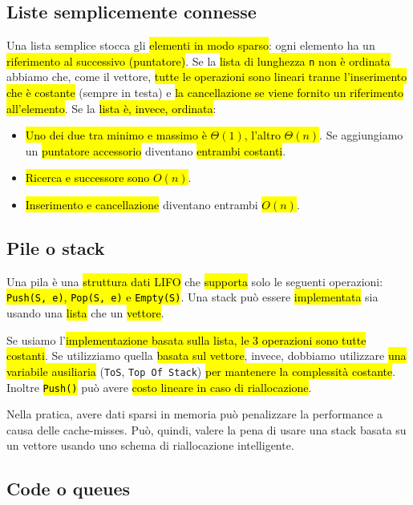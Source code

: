 \documentclass[a4paper,11pt,twoside]{article}
\theoremstyle{plain}
\theoremstyle{definition}
\theoremstyle{remark}
\begin{document}
\subsection{Liste semplicemente connesse}\label{sec:linked-list}

Una lista semplice stocca gli \hl{elementi in modo sparso}: ogni elemento ha un
\hl{riferimento al successivo (puntatore)}. Se la \hl{lista di lunghezza
\texttt{n} non è ordinata} abbiamo che, come il vettore, \hl{tutte le operazioni
sono lineari tranne l'inserimento che è costante} (sempre in testa) e \hl{la
cancellazione se viene fornito un riferimento all'elemento}. Se la \hl{lista è,
invece, ordinata}:

\begin{itemize}
  \item \hl{Uno dei due tra minimo e massimo è $\Theta(1)$, l'altro
    $\Theta(n)$}. Se aggiungiamo un \hl{puntatore accessorio} diventano
    \hl{entrambi costanti}.
  \item \hl{Ricerca e successore sono $O(n)$}.
  \item \hl{Inserimento e cancellazione} diventano entrambi \hl{$O(n)$}.
\end{itemize}

\subsection{Pile o stack}\label{sec:stack}

Una pila è una \hl{struttura dati LIFO} che \hl{supporta} solo le seguenti
operazioni: \hl{\texttt{Push(S, e)}, \texttt{Pop(S, e)} e \texttt{Empty(S)}}.
Una stack può essere \hl{implementata} sia usando una \hl{lista} che un
\hl{vettore}.

Se usiamo l'\hl{implementazione basata sulla lista, le 3 operazioni sono tutte
costanti}. Se utilizziamo quella \hl{basata sul vettore}, invece, dobbiamo
utilizzare \hl{una variabile ausiliaria} (\texttt{ToS}, \texttt{Top Of Stack})
\hl{per mantenere la complessità costante}. Inoltre \hl{\texttt{Push()}} può
avere \hl{costo lineare in caso di riallocazione}.

Nella pratica, avere dati sparsi in memoria può penalizzare la performance a
causa delle cache-misses. Può, quindi, valere la pena di usare una stack basata
su un vettore usando uno schema di riallocazione intelligente.

\subsection{Code o queues}\label{sec:queue}
\end{document}
